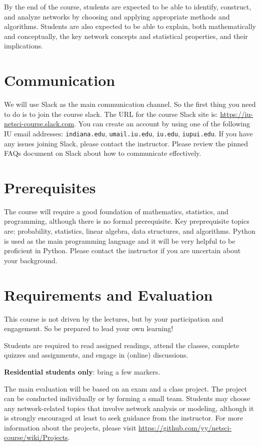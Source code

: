 \documentclass[11pt,article,oneside]{memoir} %
\begin{document}
By the end of the course, students are expected to be able to identify, construct, and analyze networks by choosing and applying appropriate methods and algorithms.
Students are also expected to be able to explain, both mathematically and conceptually, the key network concepts and statistical properties, and their implications.
\section{Communication} %

We will use Slack as the main communication channel.
So the first thing you need to do is to join the course slack.
The URL for the course Slack site is: \url{https://iu-netsci-course.slack.com}.
You can create an account by using one of the following IU email addresses: \texttt{indiana.edu}, \texttt{umail.iu.edu}, \texttt{iu.edu}, \texttt{iupui.edu}.
If you have any issues joining Slack, please contact the instructor.
Please review the pinned FAQs document on Slack about how to communicate effectively.

\section{Prerequisites} %

The course will require a good foundation of mathematics, statistics, and programming,
although there is no formal prerequisite. Key preprequisite topics are:
probability, statistics, linear algebra, data structures, and algorithms.
Python is used as the main programming language and it will be very helpful to
be proficient in Python. Please contact the instructor if you are uncertain
about your background.

\section{Requirements and Evaluation} %

This course is not driven by the lectures, but by your participation and engagement.
So be prepared to lead your own learning!

Students are required to read assigned readings, attend the classes, complete quizzes and assignments, and engage in (online) discussions.

\textbf{Residential students only}: bring a few markers.

The main evaluation will be based on an exam and a class project.
The project can be conducted individually or by forming a small team.
Students may choose any network-related topics that involve network analysis or modeling, although it is strongly encouraged at least to seek guidance from the instructor.
For more information about the projects, please visit \url{https://github.com/yy/netsci-course/wiki/Projects}.
\end{document}
